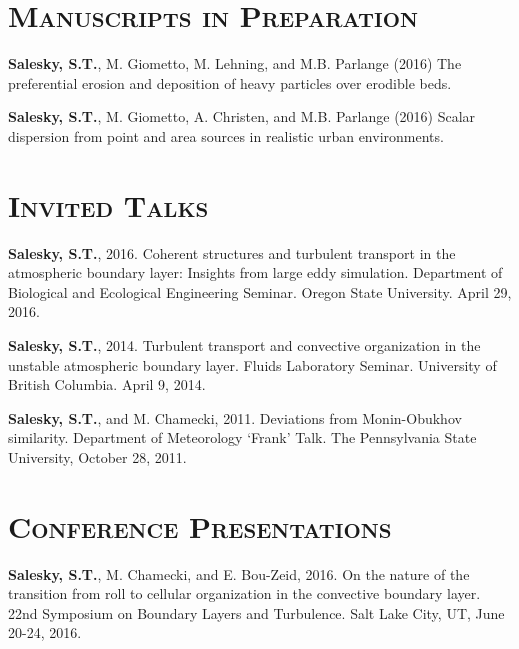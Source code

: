 \documentclass[11pt,letterpaper]{article}
\begin{document}
\section*{\textsc{Manuscripts in Preparation}} 

\textbf{Salesky, S.T.}, M. Giometto, M. Lehning, and M.B. Parlange (2016)
The preferential erosion and deposition of heavy particles over erodible beds.

\textbf{Salesky, S.T.}, M. Giometto, A. Christen, and M.B. Parlange (2016)
Scalar dispersion from point and area sources in realistic urban environments.


\section*{\textsc{Invited Talks}} 

\textbf{Salesky, S.T.}, 2016. Coherent structures and turbulent transport in the atmospheric boundary layer: Insights 
from large eddy simulation. Department of Biological and Ecological Engineering Seminar. Oregon State University. 
April 29, 2016.

\textbf{Salesky, S.T.}, 2014. Turbulent transport and convective organization in the unstable atmospheric boundary layer. Fluids Laboratory Seminar. University of British Columbia. April 9, 2014. 

\textbf{Salesky, S.T.}, and M. Chamecki, 2011. Deviations from Monin-Obukhov similarity. Department of Meteorology `Frank' Talk. The Pennsylvania State University, October 28, 2011. 

\section*{\textsc{Conference Presentations}} 


\textbf{Salesky, S.T.}, M. Chamecki, and E. Bou-Zeid, 2016. On the nature of the
transition from roll to cellular organization in the convective boundary layer.
22nd Symposium on Boundary Layers and Turbulence. Salt Lake City, UT, June
20-24, 2016.
\end{document}
